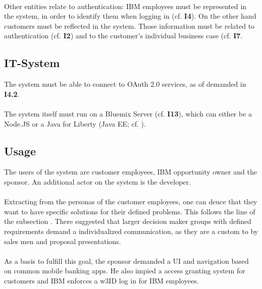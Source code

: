 \paragraph{} Other entities relate to authentication: IBM employees must be represented in the system, in order to identify them when logging in (cf. \textbf{I4}). On the other hand customers must be reflected in the system. Those information must be related to authentication (cf. \textbf{I2}) and to the customer's individual business case (cf. \textbf{I7}. 
\subsection{IT-System}
The system must be able to connect to OAuth 2.0 services, as of demanded in \textbf{I4.2}.

\paragraph{} The system itself must run on a Bluemix Server (cf. \textbf{I13}), which can either be a Node.JS or a Java for Liberty (Java EE; cf. \cite{}). 

\subsection{Usage}
The users of the system are customer employees, IBM opportunity owner and the sponsor. An additional actor on the system is the developer. 

\paragraph{} Extracting from the personas of the customer employees, one can deuce that they want to have specific solutions for their defined problems. This follows the line of the subsection . There \textcite[21]{Backhaus.2015b} suggested that larger decision maker groups with defined requirements demand a individualized communication, as they are a custom to by sales men and proposal presentations. 

\paragraph{} As a basis to fulfill this goal, the sponsor demanded a UI and navigation based on common mobile banking apps. He also impied a access granting system for customers and IBM enforces a w3ID log in for IBM employees.

